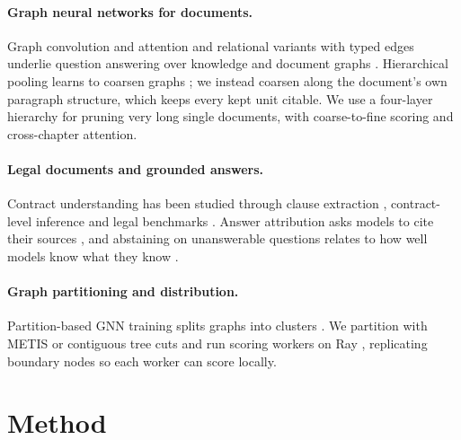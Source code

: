 \documentclass[11pt]{article}
\begin{document}
\paragraph{Graph neural networks for documents.} Graph convolution and attention \citep{kipf2017gcn,velickovic2018gat,hamilton2017graphsage} and relational variants with typed edges \citep{schlichtkrull2018rgcn} underlie question answering over knowledge and document graphs \citep{yasunaga2021qagnn,fang2020hgn}. Hierarchical pooling learns to coarsen graphs \citep{ying2018diffpool,gao2019graphunets}; we instead coarsen along the document's own paragraph structure, which keeps every kept unit citable. We use a four-layer hierarchy for pruning very long single documents, with coarse-to-fine scoring and cross-chapter attention.

\paragraph{Legal documents and grounded answers.} Contract understanding has been studied through clause extraction \citep{hendrycks2021cuad}, contract-level inference \citep{koreeda2021contractnli} and legal benchmarks \citep{chalkidis2022lexglue,guha2023legalbench}. Answer attribution asks models to cite their sources \citep{gao2023alce}, and abstaining on unanswerable questions \citep{rajpurkar2018squad2} relates to how well models know what they know \citep{kadavath2022know}.

\paragraph{Graph partitioning and distribution.} Partition-based GNN training splits graphs into clusters \citep{chiang2019clustergcn}. We partition with METIS \citep{karypis1998metis} or contiguous tree cuts and run scoring workers on Ray \citep{moritz2018ray}, replicating boundary nodes so each worker can score locally.

\section{Method}
\end{document}
